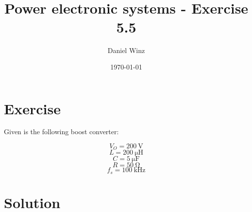 \documentclass[a4paper,11pt,fleqn]{article}
\title{Power electronic systems - Exercise 5.5}
\author{Daniel Winz}
\date{\today}
\begin{document}
\section{Exercise}
Given is the following boost converter: 

\[ V_O = \SI{200}{\volt} \]
\[ L = \SI{200}{\micro\henry} \]
\[ C = \SI{5}{\micro\farad} \]
\[ R = \SI{50}{\ohm} \]
\[ f_s = \SI{100}{\kilo\hertz} \]

\section{Solution}
\end{document}
